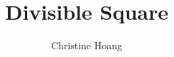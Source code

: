 \documentclass{article}
\title{Divisible Square}
\author{Christine Hoang}
\begin{document}
\maketitle

\section{}
\end{document}
